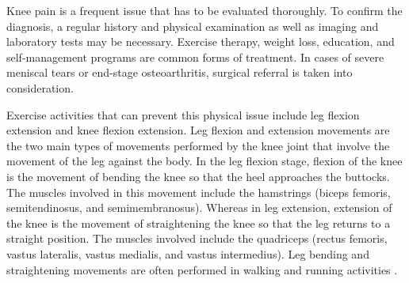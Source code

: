 Knee pain is a frequent issue that has to be evaluated thoroughly. To confirm the diagnosis, a regular history and physical examination as well as imaging and laboratory tests may be necessary. Exercise therapy, weight loss, education, and self-management programs are common forms of treatment. In cases of severe meniscal tears or end-stage osteoarthritis, surgical referral is taken into consideration.

Exercise activities that can prevent this physical issue include leg flexion extension and knee flexion extension. Leg flexion and extension movements are the two main types of movements performed by the knee joint that involve the movement of the leg against the body. In the leg flexion stage, flexion of the knee is the movement of bending the knee so that the heel approaches the buttocks. The muscles involved in this movement include the hamstrings (biceps femoris, semitendinosus, and semimembranosus). Whereas in leg extension, extension of the knee is the movement of straightening the knee so that the leg returns to a straight position. The muscles involved include the quadriceps (rectus femoris, vastus lateralis, vastus medialis, and vastus intermedius). Leg bending and straightening movements are often performed in walking and running activities \cite{LegFlexionExtension}.


